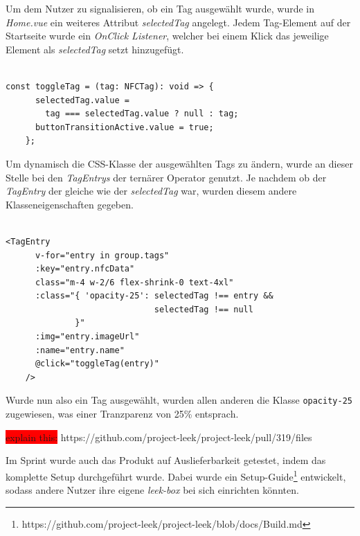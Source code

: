\documentclass[10pt, a4paper]{article}
\begin{document}
\begin{onehalfspace}
Um dem Nutzer zu signalisieren, ob ein Tag ausgewählt wurde, wurde in \textit{Home.vue} ein weiteres Attribut \textit{selectedTag} angelegt.
Jedem Tag-Element auf der Startseite wurde ein \textit{OnClick Listener}, welcher bei einem Klick das jeweilige Element als \textit{selectedTag} setzt hinzugefügt.
\\~\\
\begin{minipage}{\textwidth}
  \begin{lstlisting}[caption={Hervorgeben aus ausgewähltem NFC-Tag}, captionpos=b]
    const toggleTag = (tag: NFCTag): void => {
      selectedTag.value =
        tag === selectedTag.value ? null : tag;
      buttonTransitionActive.value = true;
    };
  \end{lstlisting}
\end{minipage}
Um dynamisch die CSS-Klasse der ausgewählten Tags zu ändern, wurde an dieser Stelle bei den \textit{TagEntrys} der ternärer Operator genutzt.
Je nachdem ob der \textit{TagEntry} der gleiche wie der \textit{selectedTag} war, wurden diesem andere Klasseneigenschaften gegeben.
\\~\\
\begin{minipage}{\textwidth}
  \begin{lstlisting}[caption={Caption}, captionpos=b]
    <TagEntry
      v-for="entry in group.tags"
      :key="entry.nfcData"
      class="m-4 w-2/6 flex-shrink-0 text-4xl"
      :class="{ 'opacity-25': selectedTag !== entry &&
                              selectedTag !== null
              }"
      :img="entry.imageUrl"
      :name="entry.name"
      @click="toggleTag(entry)"
    />
  \end{lstlisting}
\end{minipage}
Wurde nun also ein Tag ausgewählt, wurden allen anderen die Klasse \lstinline{opacity-25} zugewiesen, was einer Tranzparenz von 25\% entsprach.

\colorbox{red}{explain this:} https://github.com/project-leek/project-leek/pull/319/files

Im Sprint wurde auch das Produkt auf Auslieferbarkeit getestet, indem das komplette Setup durchgeführt wurde.
Dabei wurde ein Setup-Guide\footnote{https://github.com/project-leek/project-leek/blob/docs/Build.md} entwickelt, sodass andere Nutzer ihre eigene \textit{leek-box} bei sich einrichten könnten.


\end{onehalfspace}
\end{document}

